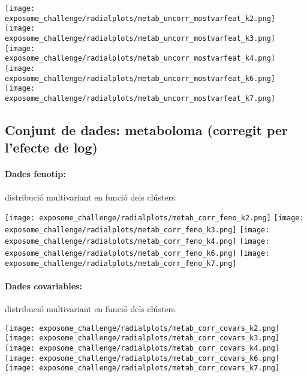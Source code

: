 \documentclass[CAT,BIB]{TFUOC}%
\begin{document}
            \begin{center}
                \texttt{[image: exposome\_challenge/radialplots/metab\_uncorr\_mostvarfeat\_k2.png]}
                \texttt{[image: exposome\_challenge/radialplots/metab\_uncorr\_mostvarfeat\_k3.png]}
                \texttt{[image: exposome\_challenge/radialplots/metab\_uncorr\_mostvarfeat\_k4.png]}
                \texttt{[image: exposome\_challenge/radialplots/metab\_uncorr\_mostvarfeat\_k6.png]}
                \texttt{[image: exposome\_challenge/radialplots/metab\_uncorr\_mostvarfeat\_k7.png]}
            \end{center}

        \subsection{Conjunt de dades: metaboloma (corregit per l'efecte de log)}

            \paragraph{Dades fenotip:} distribució multivariant en funció dels clústers.

            \begin{center}
                \texttt{[image: exposome\_challenge/radialplots/metab\_corr\_feno\_k2.png]}
                \texttt{[image: exposome\_challenge/radialplots/metab\_corr\_feno\_k3.png]}
                \texttt{[image: exposome\_challenge/radialplots/metab\_corr\_feno\_k4.png]}
                \texttt{[image: exposome\_challenge/radialplots/metab\_corr\_feno\_k6.png]}
                \texttt{[image: exposome\_challenge/radialplots/metab\_corr\_feno\_k7.png]}
            \end{center}

            \paragraph{Dades covariables:} distribució multivariant en funció dels clústers.

            \begin{center}
                \texttt{[image: exposome\_challenge/radialplots/metab\_corr\_covars\_k2.png]}
                \texttt{[image: exposome\_challenge/radialplots/metab\_corr\_covars\_k3.png]}
                \texttt{[image: exposome\_challenge/radialplots/metab\_corr\_covars\_k4.png]}
                \texttt{[image: exposome\_challenge/radialplots/metab\_corr\_covars\_k6.png]}
                \texttt{[image: exposome\_challenge/radialplots/metab\_corr\_covars\_k7.png]}
            \end{center}
\end{document}
